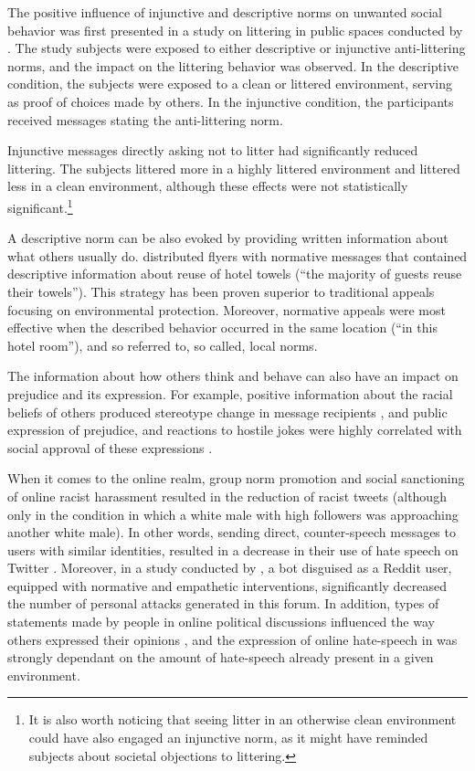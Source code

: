 \documentclass[preprint,12pt]{elsarticle}
\begin{document}
The positive influence of injunctive and descriptive norms on unwanted social behavior was first presented in a study on littering in public spaces conducted by \citet{cialdini1990focus}. The study subjects were exposed to either descriptive or injunctive anti-littering norms, and the impact on the littering behavior was observed. In the descriptive condition, the subjects were exposed to a clean or littered environment, serving as proof of choices made by others. In the injunctive condition, the participants received messages stating the anti-littering norm.

Injunctive messages directly asking not to litter had significantly reduced littering. The subjects littered more in a highly littered environment and littered less in a clean environment, although these effects were not statistically significant.\footnote{It is also worth noticing that  seeing litter in an otherwise clean environment could have also engaged an injunctive norm, as it might have reminded subjects about societal objections to littering.}


A descriptive norm can be also evoked by providing written information about what others usually do. \citet{goldstein2008room} distributed flyers with normative messages that contained descriptive information about reuse of hotel towels (“the majority of guests reuse their towels”). This strategy has been proven superior to traditional appeals focusing on environmental protection. Moreover, normative appeals were most effective when the described behavior occurred in the same location (“in this hotel  room”), and so referred to, so called, local norms. 

The information about how others think and behave can also have an impact on prejudice and its expression. For example, positive information about the racial beliefs of others produced stereotype change in message recipients \citep{stangor2001changing}, and public expression of prejudice, and reactions to hostile jokes were highly correlated with social approval of these expressions \citep{crandall2002social}. 

When it comes to the online realm, group norm promotion and social sanctioning of online racist harassment resulted in the reduction of racist tweets (although only in the condition in which a white male with high followers was approaching another white male). In other words, sending direct, counter-speech messages to users with similar identities,  resulted in a decrease in their use of hate speech on Twitter \citep{munger2017tweetment}. Moreover, in a study conducted by \citet{bilewicz2021artificial}, a bot disguised as a Reddit user, equipped with normative and empathetic interventions, significantly decreased the number of personal attacks generated in this forum. In addition, types of statements made by people in online political discussions influenced the way others expressed their opinions \citep{price2006normative}, and the expression of online hate-speech in  \citep{alvarez2018normative} was strongly dependant on the amount of hate-speech already present in a given environment.  
\end{document}
